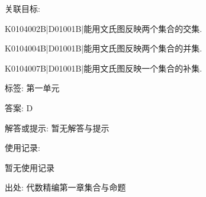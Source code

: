 \documentclass[10pt,a4paper]{article}
\begin{document}
\begin{enumerate}[1.]
关联目标:

K0104002B|D01001B|能用文氏图反映两个集合的交集.

K0104004B|D01001B|能用文氏图反映两个集合的并集.

K0104007B|D01001B|能用文氏图反映一个集合的补集.



标签: 第一单元

答案: D

解答或提示: 暂无解答与提示

使用记录:

暂无使用记录


出处: 代数精编第一章集合与命题
\end{enumerate}
\end{document}
